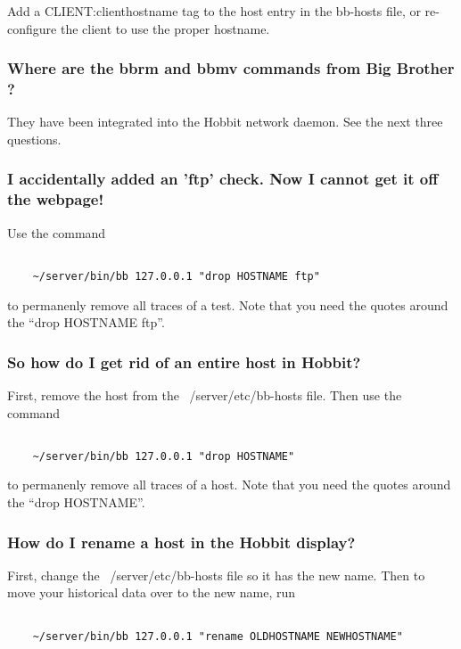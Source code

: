  Add a CLIENT:clienthostname tag to the host entry in the bb-hosts file, or re-configure the client to use the proper hostname.
\hline 
\subsubsection*{Where are the bbrm and bbmv commands from Big Brother ?}


 They have been integrated into the Hobbit network daemon. See the next three questions.
\hline 
\subsubsection*{I accidentally added an 'ftp' check. Now I cannot get it off the webpage!}


 Use the command
\begin{verbatim}

    ~/server/bin/bb 127.0.0.1 "drop HOSTNAME ftp"

\end{verbatim}


 to permanenly remove all traces of a test. Note that you need the quotes around the ``drop HOSTNAME ftp''.
\hline 
\subsubsection*{So how do I get rid of an entire host in Hobbit?}


 First, remove the host from the ~/server/etc/bb-hosts file. Then use the command
\begin{verbatim}

    ~/server/bin/bb 127.0.0.1 "drop HOSTNAME"

\end{verbatim}


 to permanenly remove all traces of a host. Note that you need the quotes around the ``drop HOSTNAME''.
\hline 
\subsubsection*{How do I rename a host in the Hobbit display?}


 First, change the ~/server/etc/bb-hosts file so it has the new name. Then to move your historical data over to the new name, run
\begin{verbatim}

    ~/server/bin/bb 127.0.0.1 "rename OLDHOSTNAME NEWHOSTNAME"

\end{verbatim}
\hline 

